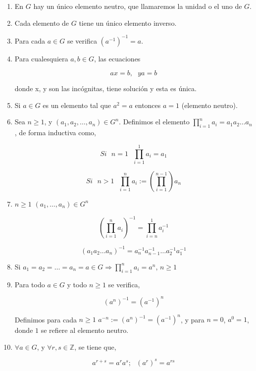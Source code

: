 \documentclass{article}
\begin{document}
\begin{enumerate}[ \bfseries (i)]
\item En $G$ hay un único elemento neutro, que llamaremos la unidad o el uno de $G$.
\item Cada elemento de $G$ tiene un único elemento inverso.
\item Para cada $a \in G$ se verifica $(a^{-1})^{-1}=a$.
\item Para cualesquiera $a,b \in G$, las ecuaciones 

\begin{equation*}
ax=b, \>\>\> ya=b
\end{equation*}

donde x, y son las incógnitas, tiene solución y esta es única.

\item Si $a \in G$ es un elemento tal que $a^2=a$ entonces $a=1$ (elemento neutro).
\item Sea $n \geq 1$, y $(a_1,a_2,\ldots,a_n)\in G^n$. Definimos el elemento $\prod_{i=1}^n a_i=a_1a_2\ldots a_n$, de forma inductiva como,

\begin{equation*}
Si \>\>\> n=1 \>\>\> \prod_{i=1}^1 a_i = a_1
\end{equation*}

\begin{equation*}
Si \>\>\> n>1 \>\>\> \prod_{i=1}^n a_i := (\prod_{i=1}^{n-1})a_n
\end{equation*}

\item $n\geq 1$ $(a_1,\ldots,a_n)\in G^n$

\begin{equation*}
(\prod_{i=1}^n a_i)^{-1} = \prod_{i=n}^1 a_i^{-1}
\end{equation*}

\begin{equation*}
(a_1a_2\ldots a_n)^{-1} = a_n^{-1}a_{n-1}^{-1}\ldots a_2^{-1}a_1^{-1}
\end{equation*}

\item Si $a_1=a_2=\ldots=a_n=a \in G \Rightarrow \prod_{i=1}^n a_i = a^n$,  $n\geq 1$
\item Para todo $a\in G$ y todo $n \geq 1$ se verifica,

\begin{equation*}
(a^n)^{-1}=(a^{-1})^n
\end{equation*}

Definimos para cada $n \geq 1$ $a^{-n}:=(a^n)^{-1}=(a^{-1})^n$, y para $n=0$,  $a^0=1$, donde $1$ se refiere al elemento neutro.

\item $\forall a \in G$, y $\forall r,s \in \mathbb{Z}$, se tiene que,

\begin{equation*}
a^{r+s}=a^ra^s; \>\>\> (a^r)^s=a^{rs}
\end{equation*}
\end{enumerate} 
\end{document}
